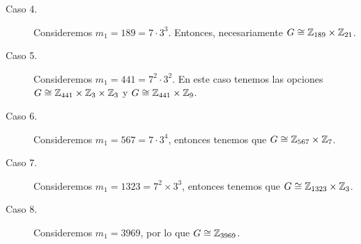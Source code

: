 \begin{eg}
\begin{enumerate}
\begin{description}
	\item[Caso 4.] Consideremos $\displaystyle m_{1} = 189 = 7 \cdot 3^{3} $. Entonces, necesariamente $\displaystyle G \cong \mathbb{Z}_{189} \times \mathbb{Z}_{21} $. 
	\item[Caso 5.] Consideremos $\displaystyle m_{1} = 441 = 7^{2} \cdot 3^{2} $. En este caso tenemos las opciones $\displaystyle G \cong \mathbb{Z}_{441} \times \mathbb{Z}_{3} \times \mathbb{Z}_{3} $ y $\displaystyle G \cong \mathbb{Z}_{441} \times \mathbb{Z}_{9} $. 
	\item[Caso 6.] Consideremos $\displaystyle m_{1} = 567 = 7 \cdot 3^{4} $, entonces tenemos que $\displaystyle G \cong \mathbb{Z}_{567} \times \mathbb{Z}_{7} $. 
	\item[Caso 7.] Consideremos $\displaystyle m_{1} = 1323 = 7^{2} \times 3^{3} $, entonces tenemos que $\displaystyle G \cong \mathbb{Z}_{1323} \times \mathbb{Z}_{3} $.
	\item[Caso 8.] Consideremos $\displaystyle m_{1} = 3969 $, por lo que $\displaystyle G \cong \mathbb{Z}_{3969} $.
	\end{description}
\end{enumerate}
\end{eg}

